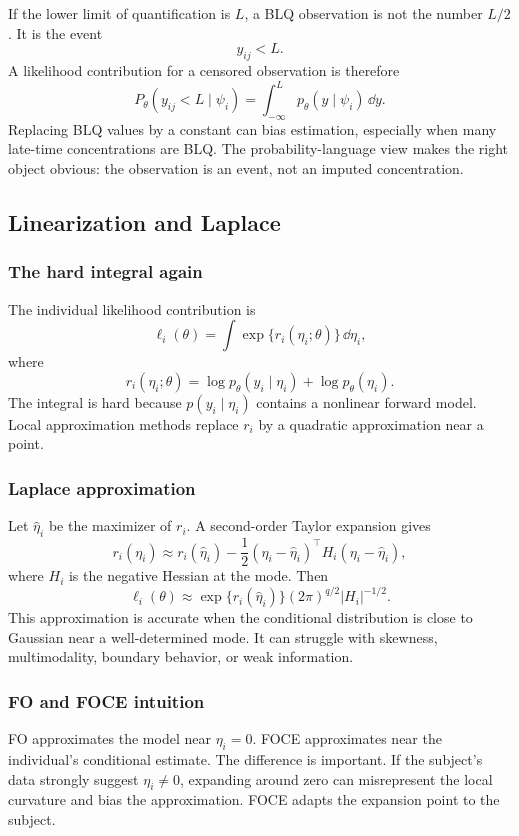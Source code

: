 If the lower limit of quantification is \(L\), a BLQ observation is not the number \(L/2\).  It is the event
\[
  y_{ij}<L.
\]
A likelihood contribution for a censored observation is therefore
\[
  P_\theta(y_{ij}<L\mid\psi_i)
  =
  \int_{-\infty}^{L}p_\theta(y\mid\psi_i)\,\dd y.
\]
Replacing BLQ values by a constant can bias estimation, especially when many late-time concentrations are BLQ.  The probability-language view makes the right object obvious: the observation is an event, not an imputed concentration.

\subsection{Linearization and Laplace}

\subsubsection*{The hard integral again}

The individual likelihood contribution is
\[
  \ell_i(\theta)=\int \exp\{r_i(\eta_i;\theta)\}\,\dd\eta_i,
\]
where
\[
  r_i(\eta_i;\theta)
  =
  \log p_\theta(y_i\mid \eta_i)
  +
  \log p_\theta(\eta_i).
\]
The integral is hard because \(p(y_i\mid\eta_i)\) contains a nonlinear forward model.  Local approximation methods replace \(r_i\) by a quadratic approximation near a point.

\subsubsection*{Laplace approximation}

Let \(\widehat\eta_i\) be the maximizer of \(r_i\).  A second-order Taylor expansion gives
\[
  r_i(\eta_i)
  \approx
  r_i(\widehat\eta_i)
  -
  \frac{1}{2}
  (\eta_i-\widehat\eta_i)^\top H_i
  (\eta_i-\widehat\eta_i),
\]
where \(H_i\) is the negative Hessian at the mode.  Then
\[
  \ell_i(\theta)
  \approx
  \exp\{r_i(\widehat\eta_i)\}
  (2\pi)^{q/2}|H_i|^{-1/2}.
\]
This approximation is accurate when the conditional distribution is close to Gaussian near a well-determined mode.  It can struggle with skewness, multimodality, boundary behavior, or weak information.

\subsubsection*{FO and FOCE intuition}

FO approximates the model near \(\eta_i=0\).  FOCE approximates near the individual's conditional estimate.  The difference is important.  If the subject's data strongly suggest \(\eta_i\neq 0\), expanding around zero can misrepresent the local curvature and bias the approximation.  FOCE adapts the expansion point to the subject.

